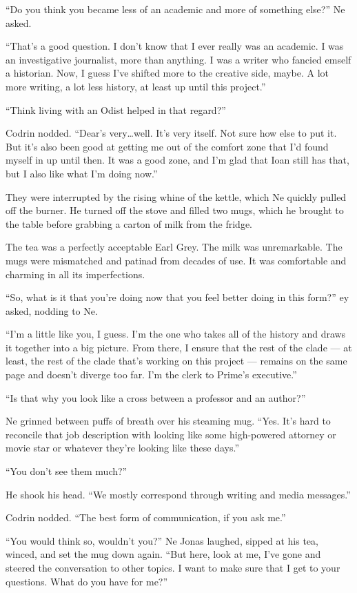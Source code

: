 ``Do you think you became less of an academic and more of something else?'' Ne asked.

``That's a good question. I don't know that I ever really was an academic. I was an investigative journalist, more than anything. I was a writer who fancied emself a historian. Now, I guess I've shifted more to the creative side, maybe. A lot more writing, a lot less history, at least up until this project.''

``Think living with an Odist helped in that regard?''

Codrin nodded. ``Dear's very\ldots well. It's very itself. Not sure how else to put it. But it's also been good at getting me out of the comfort zone that I'd found myself in up until then. It was a good zone, and I'm glad that Ioan still has that, but I also like what I'm doing now.''

They were interrupted by the rising whine of the kettle, which Ne quickly pulled off the burner. He turned off the stove and filled two mugs, which he brought to the table before grabbing a carton of milk from the fridge.

The tea was a perfectly acceptable Earl Grey. The milk was unremarkable. The mugs were mismatched and patinad from decades of use. It was comfortable and charming in all its imperfections.

``So, what is it that you're doing now that you feel better doing in this form?'' ey asked, nodding to Ne.

``I'm a little like you, I guess. I'm the one who takes all of the history and draws it together into a big picture. From there, I ensure that the rest of the clade — at least, the rest of the clade that's working on this project — remains on the same page and doesn't diverge too far. I'm the clerk to Prime's executive.''

``Is that why you look like a cross between a professor and an author?''

Ne grinned between puffs of breath over his steaming mug. ``Yes. It's hard to reconcile that job description with looking like some high-powered attorney or movie star or whatever they're looking like these days.''

``You don't see them much?''

He shook his head. ``We mostly correspond through writing and media messages.''

Codrin nodded. ``The best form of communication, if you ask me.''

``You would think so, wouldn't you?'' Ne Jonas laughed, sipped at his tea, winced, and set the mug down again. ``But here, look at me, I've gone and steered the conversation to other topics. I want to make sure that I get to your questions. What do you have for me?''

